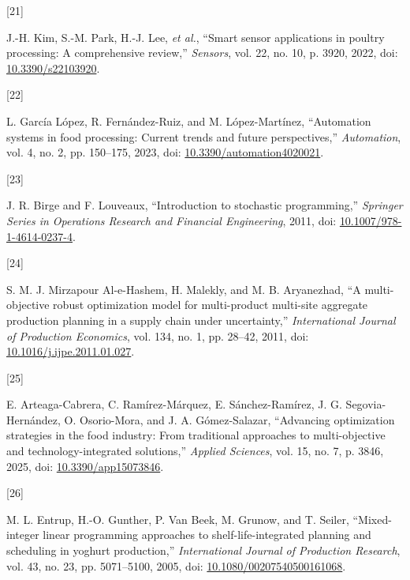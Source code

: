 \documentclass[
  spanish,
  12pt,
]{article}
\newlength{\cslhangindent}
\newlength{\csllabelwidth}
\newenvironment{CSLReferences}[2] %
 {\begin{list}{}{%
  \setlength{\itemindent}{0pt}
  \setlength{\leftmargin}{0pt}
  \setlength{\parsep}{0pt}
  \ifodd #1
   \setlength{\leftmargin}{\cslhangindent}
   \setlength{\itemindent}{-1\cslhangindent}
  \fi
  \setlength{\itemsep}{#2\baselineskip}}}
 {\end{list}}
\newcommand{\CSLLeftMargin}[1]{\parbox[t]{\csllabelwidth}{\strut#1\strut}}
\newcommand{\CSLRightInline}[1]{\parbox[t]{\linewidth - \csllabelwidth}{\strut#1\strut}}
\begin{document}
\begin{CSLReferences}{0}{0}
\CSLLeftMargin{{[}21{]} }%
\CSLRightInline{J.-H. Kim, S.-M. Park, H.-J. Lee, \emph{et al.},
{``Smart sensor applications in poultry processing: A comprehensive
review,''} \emph{Sensors}, vol. 22, no. 10, p. 3920, 2022, doi:
\href{https://doi.org/10.3390/s22103920}{10.3390/s22103920}.}

\CSLLeftMargin{{[}22{]} }%
\CSLRightInline{L. García López, R. Fernández-Ruiz, and M.
López-Martínez, {``Automation systems in food processing: Current trends
and future perspectives,''} \emph{Automation}, vol. 4, no. 2, pp.
150--175, 2023, doi:
\href{https://doi.org/10.3390/automation4020021}{10.3390/automation4020021}.}

\CSLLeftMargin{{[}23{]} }%
\CSLRightInline{J. R. Birge and F. Louveaux, {``Introduction to
stochastic programming,''} \emph{Springer Series in Operations Research
and Financial Engineering}, 2011, doi:
\href{https://doi.org/10.1007/978-1-4614-0237-4}{10.1007/978-1-4614-0237-4}.}

\CSLLeftMargin{{[}24{]} }%
\CSLRightInline{S. M. J. Mirzapour Al-e-Hashem, H. Malekly, and M. B.
Aryanezhad, {``A multi-objective robust optimization model for
multi-product multi-site aggregate production planning in a supply chain
under uncertainty,''} \emph{International Journal of Production
Economics}, vol. 134, no. 1, pp. 28--42, 2011, doi:
\href{https://doi.org/10.1016/j.ijpe.2011.01.027}{10.1016/j.ijpe.2011.01.027}.}

\CSLLeftMargin{{[}25{]} }%
\CSLRightInline{E. Arteaga-Cabrera, C. Ramírez-Márquez, E.
Sánchez-Ramírez, J. G. Segovia-Hernández, O. Osorio-Mora, and J. A.
Gómez-Salazar, {``Advancing optimization strategies in the food
industry: From traditional approaches to multi-objective and
technology-integrated solutions,''} \emph{Applied Sciences}, vol. 15,
no. 7, p. 3846, 2025, doi:
\href{https://doi.org/10.3390/app15073846}{10.3390/app15073846}.}

\CSLLeftMargin{{[}26{]} }%
\CSLRightInline{M. L. Entrup, H.-O. Gunther, P. Van Beek, M. Grunow, and
T. Seiler, {``Mixed-integer linear programming approaches to
shelf-life-integrated planning and scheduling in yoghurt production,''}
\emph{International Journal of Production Research}, vol. 43, no. 23,
pp. 5071--5100, 2005, doi:
\href{https://doi.org/10.1080/00207540500161068}{10.1080/00207540500161068}.}


\end{CSLReferences}
\end{document}
